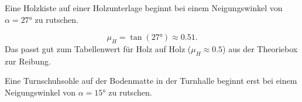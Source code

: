 \documentclass[addpoints,11pt,a4paper]{exam}
\newlength{\antwortraumlen}
\newcommand{\Antwortraum}[1]{%
  \pgfmathsetlength{\antwortraumlen}{#1*2.5cm}%
  \begin{answerbox}
    \rule{0pt}{\antwortraumlen}%
  \end{answerbox}%
}
\begin{document}
\begin{beispielbox}
Eine Holzkiste auf einer Holzunterlage beginnt bei einem Neigungswinkel
von $\alpha=\ang{27}$ zu rutschen.

\[
  \mu_H = \tan(\ang{27}) \approx 0.51.
\]
Das passt gut zum Tabellenwert für Holz auf Holz ($\mu_H\approx0.5$) aus
der Theoriebox zur Reibung.
\end{beispielbox}

\begin{questions}
\begin{taskbox}
\question[4] Eine Turnschuhsohle auf der Bodenmatte in der Turnhalle
beginnt erst bei einem Neigungswinkel von $\alpha=\ang{15}$ zu rutschen.

\end{taskbox}
\end{questions}
\end{document}
